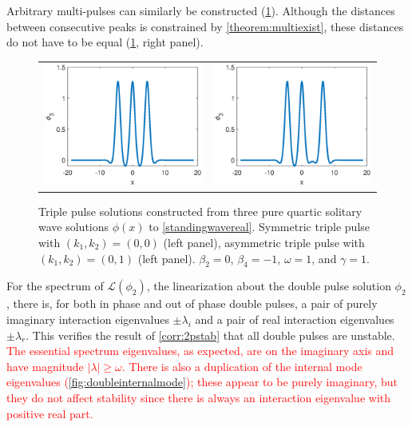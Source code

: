 \documentclass[12pt]{elsarticle}
\def\calL{{\mathcal L}}
\newcommand{\revised}[1]{ \textcolor{red}{#1} }
\begin{document}
Arbitrary multi-pulses can similarly be constructed (\cref{fig:triplepulses}). Although the distances between consecutive peaks is constrained by \cref{theorem:multiexist}, these distances do not have to be equal (\cref{fig:triplepulses}, right panel).

\begin{figure}[H]
\centering
\begin{tabular}{cc}
\includegraphics[width=8cm]{images/triple00} &
\includegraphics[width=8cm]{images/triple01}
\end{tabular}
\caption{Triple pulse solutions constructed from three pure quartic solitary wave solutions $\phi(x)$ to \cref{standingwavereal}. Symmetric triple pulse with $(k_1, k_2) = (0,0)$ (left panel), asymmetric triple pulse with $(k_1, k_2) = (0,1)$ (left panel). $\beta_2 = 0$, $\beta_4 = -1$, $\omega = 1$, and $\gamma = 1$. }
\label{fig:triplepulses}
\end{figure} 

For the spectrum of $\calL(\phi_2)$, the linearization about the double pulse solution $\phi_2$, there is, for both in phase and out of phase double pulses, a pair of purely imaginary interaction eigenvalues $\pm \lambda_i$ and a pair of real interaction eigenvalues $\pm \lambda_r$. This verifies the result of \cref{corr:2pstab} that all double pulses are unstable. \revised{The essential spectrum eigenvalues, as expected, are on the imaginary axis and have magnitude $|\lambda| \geq \omega$. There is also a duplication of the internal mode eigenvalues (\cref{fig:doubleinternalmode}); these appear to be purely imaginary, but they do not affect stability since there is always an interaction eigenvalue with positive real part.}
\end{document}
